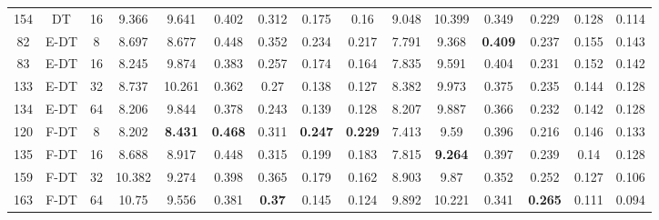 \begin{table}
\begin{tabular}{@{\hskip3pt}c@{\hskip3pt}c@{\hskip3pt}c@{\hskip3pt}c@{\hskip3pt}c@{\hskip3pt}c@{\hskip3pt}c@{\hskip3pt}c@{\hskip3pt}c@{\hskip3pt}c@{\hskip3pt}c@{\hskip3pt}c@{\hskip3pt}c@{\hskip3pt}c@{\hskip3pt}c}
        154 &             DT &                  16 &             9.366 &           9.641 &           0.402 &          0.312 &           0.175 &            0.16 &               9.048 &          10.399 &           0.349 &           0.229 &           0.128 &           0.114 \\
         82 &           E-DT &                   8 &             8.697 &           8.677 &           0.448 &          0.352 &           0.234 &           0.217 &               7.791 &           9.368 &  \textbf{0.409} &           0.237 &           0.155 &           0.143 \\
         83 &           E-DT &                  16 &             8.245 &           9.874 &           0.383 &          0.257 &           0.174 &           0.164 &               7.835 &           9.591 &           0.404 &           0.231 &           0.152 &           0.142 \\
        133 &           E-DT &                  32 &             8.737 &          10.261 &           0.362 &           0.27 &           0.138 &           0.127 &               8.382 &           9.973 &           0.375 &           0.235 &           0.144 &           0.128 \\
        134 &           E-DT &                  64 &             8.206 &           9.844 &           0.378 &          0.243 &           0.139 &           0.128 &               8.207 &           9.887 &           0.366 &           0.232 &           0.142 &           0.128 \\
        120 &           F-DT &                   8 &             8.202 &  \textbf{8.431} &  \textbf{0.468} &          0.311 &  \textbf{0.247} &  \textbf{0.229} &               7.413 &            9.59 &           0.396 &           0.216 &           0.146 &           0.133 \\
        135 &           F-DT &                  16 &             8.688 &           8.917 &           0.448 &          0.315 &           0.199 &           0.183 &               7.815 &  \textbf{9.264} &           0.397 &           0.239 &            0.14 &           0.128 \\
        159 &           F-DT &                  32 &            10.382 &           9.274 &           0.398 &          0.365 &           0.179 &           0.162 &               8.903 &            9.87 &           0.352 &           0.252 &           0.127 &           0.106 \\
        163 &           F-DT &                  64 &             10.75 &           9.556 &           0.381 &  \textbf{0.37} &           0.145 &           0.124 &               9.892 &          10.221 &           0.341 &  \textbf{0.265} &           0.111 &           0.094 \\
\bottomrule
\end{tabular}
\end{table}
